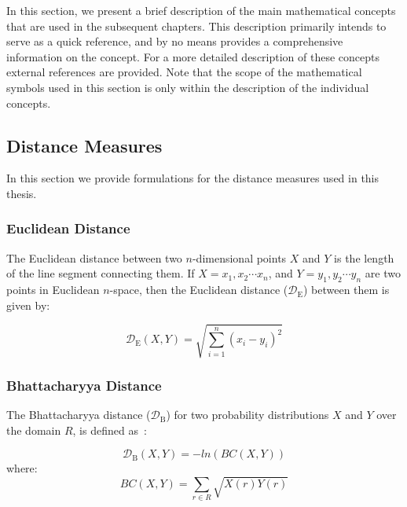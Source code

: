 In this section, we present a brief description of the main mathematical concepts that are used in the subsequent chapters. This description primarily intends to serve as a quick reference, and by no means provides a comprehensive information on the concept. For a more detailed description of these concepts external references are provided. Note that the scope of the mathematical symbols used in this section is only within the description of the individual concepts. 

\subsection{Distance Measures}
\label{sec:distance_measures}

In this section we provide formulations for the distance measures used in this thesis. 

\subsubsection{Euclidean Distance}
\label{sec:euclidean_distance}

The Euclidean distance between two $n$-dimensional points $X$ and $Y$ is the length of the line segment connecting them. If $X=x_1, x_2\cdots x_n$, and $Y=y_1, y_2\cdots y_n$ are two points in Euclidean $n$-space, then the Euclidean distance ($\mathcal{D}_\mathrm{E}$) between them is given by:

\begin{equation}
\label{eq:euclidean_distance}
	\mathcal{D}_\mathrm{E}(X,Y) = \sqrt{\sum_{i=1}^{n}(x_i-y_i)^2}	
\end{equation}

\subsubsection{Bhattacharyya Distance}
\label{sec:bhattacharya_distance}

The Bhattacharyya distance  ($\mathcal{D}_\mathrm{B}$) for two probability distributions $X$ and $Y$ over the domain $R$,  is defined as~\citep{bhattacharyya1946measure}:

\begin{equation}
\label{eq:bhattacharya_distance}
\mathcal{D}_\mathrm{B}(X,Y) = -ln(BC(X,Y)) 
\end{equation}
where:
\begin{equation}
BC(X,Y) = \sum_{r \in R} \sqrt{X(r)Y(r)}
\end{equation}


